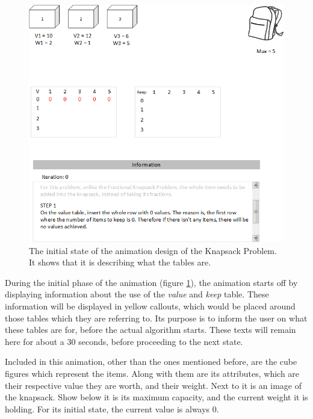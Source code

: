 \begin{figure}[H]
\centering
\includegraphics[scale=0.7]{images/report_images/animationDesignKnapsackProblem_STEP2.png}
\caption{The initial state of the animation design of the Knapsack Problem. It shows that it is describing what the tables are.}
\label{animationDesignKnapsackProblem}
\end{figure}

During the initial phase of the animation (figure \ref{animationDesignKnapsackProblem}), the animation starts off by displaying information about the use of the \textit{value} and \textit{keep} table. These information will be displayed in yellow callouts, which would be placed around those tables which they are referring to. Its purpose is to inform the user on what these tables are for, before the actual algorithm starts. These texts will remain here for about a 30 seconds, before proceeding to the next state.

Included in this animation, other than the ones mentioned before, are the cube figures which represent the items. Along with them are its attributes, which are their respective value they are worth, and their weight. Next to it is an image of the knapsack. Show below it is its maximum capacity, and the current weight it is holding. For its initial state, the current value is always 0.

